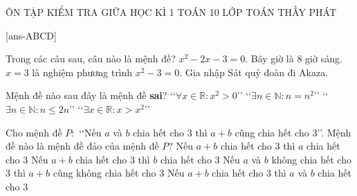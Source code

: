 \begin{name}
	{ÔN TẬP KIỂM TRA GIỮA HỌC KÌ 1}
	{TOÁN 10}
	{LỚP TOÁN THẦY PHÁT}
	{\thoigian}
\end{name}

\caulc

[ans-ABCD]

\begin{ex}%
	Trong các câu sau, câu nào là mệnh đề?
	\def\dotEX{}
	\choice
	{$x^2-2x-3=0$.}
	{Bây giờ là 8 giờ sáng.}
	{\True $x=3$ là nghiệm phương trình $x^2-3=0$.}
	{Gia nhập Sát quỷ đoàn đi Akaza.}
\end{ex}

\begin{ex}%
	Mệnh đề nào sau đây là mệnh đề \textbf{sai}?
	\choice
	{\True \lq\lq $\forall x\in \mathbb{R}\colon x^2>0$\rq\rq}
	{\lq\lq $\exists n\in \mathbb{N}\colon n=n^2$\rq\rq}
	{\lq\lq $\exists n\in \mathbb{N}\colon n\leq 2n$\rq\rq}
	{\lq\lq $\exists x\in \mathbb{R}\colon x>x^2$\rq\rq}
\end{ex}

\begin{ex}%
	Cho mệnh đề $P\colon$ \lq\lq Nếu $a$ và $b$ chia hết cho $3$ thì $a+b$ cũng chia hết cho $3$\rq\rq. Mệnh đề nào là mệnh đề đảo của mệnh đề $P$?
	\choice
	{Nếu $a+b$ chia hết cho $3$ thì $a$ chia hết cho $3$}
	{Nếu $a+b$ chia hết cho $3$ thì $b$ chia hết cho $3$}
	{Nếu $a$ và $b$ không chia hết cho $3$ thì $a+b$ cũng không chia hết cho $3$}
	{\True Nếu $a+b$ chia hết cho $3$ thì $a$ và $b$ chia hết cho $3$}
\end{ex}

